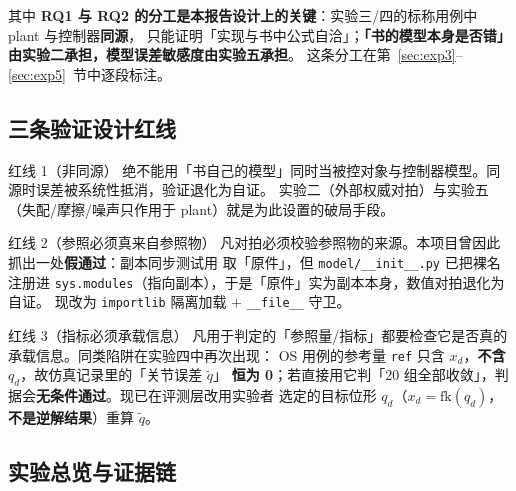 \documentclass[11pt,a4paper]{ctexart}
\begin{document}
其中 \textbf{RQ1 与 RQ2 的分工是本报告设计上的关键}：实验三/四的标称用例中 plant 与控制器\textbf{同源}，
只能证明「实现与书中公式自洽」；\textbf{「书的模型本身是否错」由实验二承担，模型误差敏感度由实验五承担}。
这条分工在第~\ref{sec:exp3}--\ref{sec:exp5}~节中逐段标注。

\subsection{三条验证设计红线}\label{sec:redlines}

\begin{warnbox}{红线 1（非同源）}
绝不能用「书自己的模型」同时当被控对象与控制器模型。同源时误差被系统性抵消，验证退化为自证。
实验二（外部权威对拍）与实验五（失配/摩擦/噪声只作用于 plant）就是为此设置的破局手段。
\end{warnbox}

\begin{warnbox}{红线 2（参照必须真来自参照物）}
凡对拍必须校验参照物的来源。本项目曾因此抓出一处\textbf{假通过}：副本同步测试用
 取「原件」，但 \texttt{model/\_\_init\_\_.py} 已把裸名注册进
\texttt{sys.modules}（指向副本），于是「原件」实为副本本身，数值对拍退化为自证。
现改为 \texttt{importlib} 隔离加载 + \texttt{\_\_file\_\_} 守卫。
\end{warnbox}

\begin{warnbox}{红线 3（指标必须承载信息）}
凡用于判定的「参照量/指标」都要检查它是否真的承载信息。同类陷阱在实验四中再次出现：
OS 用例的参考量 \texttt{ref} 只含 $x_d$，\textbf{不含} $q_d$，故仿真记录里的「关节误差 $\tilde q$」
\textbf{恒为 0}；若直接用它判「20 组全部收敛」，判据会\textbf{无条件通过}。现已在评测层改用实验者
选定的目标位形 $q_d$（$x_d=\mathrm{fk}(q_d)$，\textbf{不是逆解结果}）重算 $\tilde q$。
\end{warnbox}

\subsection{实验总览与证据链}

\begin{table}[H]
\centering
\small
{}
\end{table}
\end{document}
